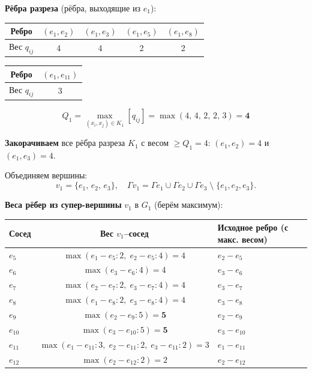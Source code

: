 \documentclass[a4paper,12pt]{article}
\begin{document}
\textbf{Рёбра разреза} (рёбра, выходящие из $e_1$):

\begin{center}
	\begin{tabular}{|c|c|c|c|c|}
		\hline
		Ребро        & $(e_1,e_2)$ & $(e_1,e_3)$ & $(e_1,e_5)$ & $(e_1,e_8)$ \\
		\hline
		Вес $q_{ij}$ & 4           & 4           & 2           & 2           \\
		\hline
	\end{tabular}
	\quad
	\begin{tabular}{|c|c|}
		\hline
		Ребро        & $(e_1,e_{11})$ \\
		\hline
		Вес $q_{ij}$ & 3              \\
		\hline
	\end{tabular}
\end{center}

\[
	Q_1 = \max_{(x_i,x_j)\in K_1}[q_{ij}] = \max(4,\,4,\,2,\,2,\,3) = \mathbf{4}
\]

\textbf{Закорачиваем} все рёбра разреза $K_1$ с весом $\geq Q_1 = 4$:
$(e_1,e_2) = 4$ и $(e_1,e_3) = 4$.

Объединяем вершины:
\[
	v_1 = \{e_1,\,e_2,\,e_3\}, \quad
	\Gamma v_1 = \Gamma e_1 \cup \Gamma e_2 \cup \Gamma e_3 \;\setminus\; \{e_1,e_2,e_3\}.
\]

\textbf{Веса рёбер из супер-вершины} $v_1$ в $G_1$ (берём максимум):

\begin{center}
	\renewcommand{\arraystretch}{1.2}
	\begin{tabular}{|l|c|l|}
		\hline
		\textbf{Сосед} & \textbf{Вес $v_1$–сосед}                                             & \textbf{Исходное ребро (с макс. весом)} \\
		\hline
		$e_5$          & $\max(e_1{-}e_5{:}2,\; e_2{-}e_5{:}4) = 4$                           & $e_2 - e_5$                             \\
		$e_6$          & $\max(e_3{-}e_6{:}4) = 4$                                            & $e_3 - e_6$                             \\
		$e_7$          & $\max(e_2{-}e_7{:}2,\; e_3{-}e_7{:}4) = 4$                           & $e_3 - e_7$                             \\
		$e_8$          & $\max(e_1{-}e_8{:}2,\; e_3{-}e_8{:}4) = 4$                           & $e_3 - e_8$                             \\
		$e_9$          & $\max(e_2{-}e_9{:}5) = \mathbf{5}$                                   & $e_2 - e_9$                             \\
		$e_{10}$       & $\max(e_3{-}e_{10}{:}5) = \mathbf{5}$                                & $e_3 - e_{10}$                          \\
		$e_{11}$       & $\max(e_1{-}e_{11}{:}3,\; e_2{-}e_{11}{:}2,\; e_3{-}e_{11}{:}2) = 3$ & $e_1 - e_{11}$                          \\
		$e_{12}$       & $\max(e_2{-}e_{12}{:}2) = 2$                                         & $e_2 - e_{12}$                          \\
		\hline
	\end{tabular}
\end{center}
\end{document}
